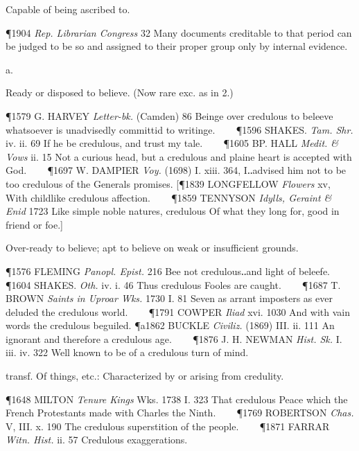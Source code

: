 \begin{description}[wide, labelwidth=!, labelindent=0pt]
\begin{myenumerate}
 Capable of being ascribed to.

\P 1904 \textit{Rep.  Librarian Congress} 32 Many documents creditable to that period can be judged to be so and assigned to their proper group only by internal evidence.
\end{myenumerate}


 a.

\noindent {}

\vspace{-0.3cm}

\begin{myenumerate}

 Ready or disposed to believe. (Now rare exc. as in 2.)

\P 1579 G. HARVEY  \textit{Letter-bk.} (Camden) 86 Beinge over credulous to beleeve whatsoever is unadvisedly committid to writinge.    
\P 1596 SHAKES.  \textit{Tam. Shr.} iv. ii. 69 If he be credulous, and trust my tale.    
\P 1605 BP. HALL  \textit{Medit. \& Vows} ii. 15 Not a curious head, but a credulous and plaine heart is accepted with God.    
\P 1697 W. DAMPIER  \textit{Voy.} (1698) I. xiii. 364, I‥advised him not to be too credulous of the Generals promises. 
[\P 1839 LONGFELLOW  \textit{Flowers} xv, With childlike credulous affection.    
\P 1859 TENNYSON  \textit{Idylls, Geraint \& Enid} 1723 Like  simple noble natures, credulous Of what they long for, good in friend or foe.]

 Over-ready to believe; apt to believe on weak or insufficient grounds.

\P 1576 FLEMING  \textit{Panopl. Epist.} 216 Bee not credulous‥and light of beleefe.    
\P 1604 SHAKES.  \textit{Oth.} iv. i. 46 Thus credulous Fooles are caught.    
\P 1687 T. BROWN  \textit{Saints in Uproar Wks.} 1730 I. 81 Seven  as arrant imposters as ever deluded the credulous world.    
\P 1791 COWPER \textit{Iliad} xvi. 1030 And  with vain words the credulous beguiled.
\P a1862 BUCKLE  \textit{Civiliz.} (1869) III. ii. 111 An ignorant and therefore a credulous age.    
\P 1876 J. H. NEWMAN  \textit{Hist. Sk.} I. iii. iv. 322 Well known to be of a credulous turn of mind.

 transf. Of things, etc.: Characterized by or arising from credulity.

\P 1648 MILTON  \textit{Tenure Kings} Wks. 1738 I. 323  That credulous Peace which the French Protestants made with Charles the Ninth.    
\P 1769 ROBERTSON  \textit{Chas.} V, III. x. 190 The credulous superstition of the people.    
\P 1871 FARRAR  \textit{Witn. Hist.} ii. 57 Credulous exaggerations.


\end{myenumerate}
\end{description}
